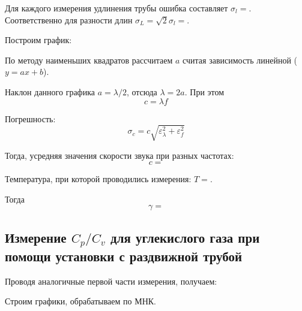 \documentclass[12pt,a4paper]{article}
\begin{document}
		Для каждого измерения удлинения трубы ошибка составляет $\sigma_l = $.
		Соответственно для разности длин $\sigma_L = \sqrt{2} \sigma_l = $.
		
		Построим график:
		
	
		По методу наименьших квадратов рассчитаем $a$ считая зависимость линейной ($y = ax + b$).
	
		
		Наклон данного графика $a = \lambda/2$, отсюда $\lambda = 2a$.
		При этом 
			$$c = \lambda f$$
		
		Погрешность:
			$$\sigma_c = c \sqrt{\varepsilon_{\lambda}^2 + \varepsilon_{f}^2}$$
		
		Тогда, усредняя значения скорости звука при разных частотах:
			$$c = $$
			
		Температура, при которой проводились измерения: $T = $.
		
		Тогда
			$$\gamma = $$
		
		\subsection*{Измерение $ C_p/C_v $ для углекислого газа при помощи установки с раздвижной трубой}
		
		Проводя аналогичные первой части измерения, получаем:
		
		
		Строим графики, обрабатываем по МНК.
		
		
		
\end{document}
